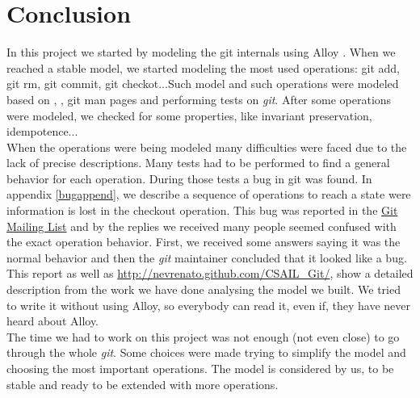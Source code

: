 \chapter{Conclusion}
In this project we started by modeling the git internals using Alloy
\cite{Jackson:2006:SAL:1146359}. When we reached
a stable model, we started modeling the most used operations: git
add, git rm, git commit, git checkot...Such model and such
operations were modeled based on \cite{gitComm}, \cite{progit}, git man
pages and performing tests on \emph{git}. After some operations were
modeled, we checked for some properties, like invariant
preservation, idempotence...\\

When the operations were being modeled many
difficulties were faced due to the lack of precise descriptions. 
Many tests had to be performed to find a general behavior for each
operation. During those tests a bug in git was found. In appendix
\ref{bugappend}, we describe a
sequence of operations to reach a state were information is lost in the
checkout operation. This
bug was reported in the \href{mailto:git@vger.kernel.org}{Git Mailing
List} and by the replies we received many people seemed confused with the
exact operation behavior. First, we received some answers saying it
was the normal behavior and then the \emph{git} maintainer concluded that
it looked like a bug.\\

This report as well as
\href{http://nevrenato.github.com/CSAIL_Git/}{http://nevrenato.github.com/CSAIL\_Git/},
show a detailed description from the work we have done analysing the
model we built. We tried to write it without using Alloy, so
everybody can read it, even if, they have never heard about Alloy.\\

The time we had to work on this project was not enough (not even close) to
go through the whole \emph{git}. Some choices were made trying to
simplify the model and choosing the most important operations. The
model is considered by us, to be stable and ready to be extended with
more operations.\\
